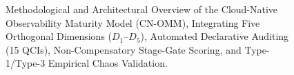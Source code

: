\begin{figure}[t]
\caption{Methodological and Architectural Overview of the Cloud-Native Observability Maturity Model (CN-OMM), Integrating Five Orthogonal Dimensions ($D_1$--$D_5$), Automated Declarative Auditing (15 QCIs), Non-Compensatory Stage-Gate Scoring, and Type-1/Type-3 Empirical Chaos Validation.}
\label{fig:cn_omm_architecture}
\end{figure}
